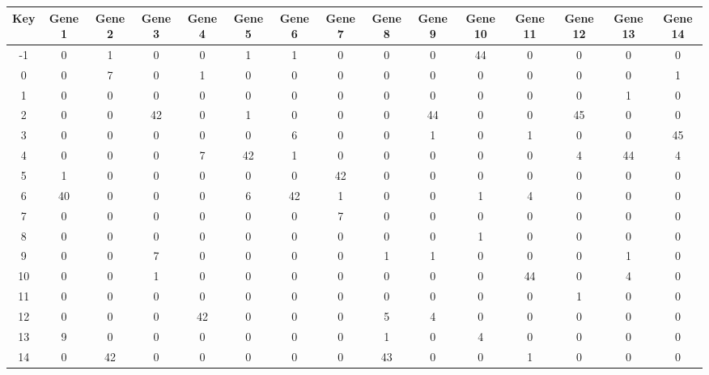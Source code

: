 \begin{tabular}{|c|c|c|c|c|c|c|c|c|c|c|c|c|c|c|}
\hline
Key & Gene 1 & Gene 2 & Gene 3 & Gene 4 & Gene 5 & Gene 6 & Gene 7 & Gene 8 & Gene 9 & Gene 10 & Gene 11 & Gene 12 & Gene 13 & Gene 14 \\
\hline
-1 & 0 & 1 & 0 & 0 & 1 & 1 & 0 & 0 & 0 & 44 & 0 & 0 & 0 & 0 \\
0 & 0 & 7 & 0 & 1 & 0 & 0 & 0 & 0 & 0 & 0 & 0 & 0 & 0 & 1 \\
1 & 0 & 0 & 0 & 0 & 0 & 0 & 0 & 0 & 0 & 0 & 0 & 0 & 1 & 0 \\
2 & 0 & 0 & 42 & 0 & 1 & 0 & 0 & 0 & 44 & 0 & 0 & 45 & 0 & 0 \\
3 & 0 & 0 & 0 & 0 & 0 & 6 & 0 & 0 & 1 & 0 & 1 & 0 & 0 & 45 \\
4 & 0 & 0 & 0 & 7 & 42 & 1 & 0 & 0 & 0 & 0 & 0 & 4 & 44 & 4 \\
5 & 1 & 0 & 0 & 0 & 0 & 0 & 42 & 0 & 0 & 0 & 0 & 0 & 0 & 0 \\
6 & 40 & 0 & 0 & 0 & 6 & 42 & 1 & 0 & 0 & 1 & 4 & 0 & 0 & 0 \\
7 & 0 & 0 & 0 & 0 & 0 & 0 & 7 & 0 & 0 & 0 & 0 & 0 & 0 & 0 \\
8 & 0 & 0 & 0 & 0 & 0 & 0 & 0 & 0 & 0 & 1 & 0 & 0 & 0 & 0 \\
9 & 0 & 0 & 7 & 0 & 0 & 0 & 0 & 1 & 1 & 0 & 0 & 0 & 1 & 0 \\
10 & 0 & 0 & 1 & 0 & 0 & 0 & 0 & 0 & 0 & 0 & 44 & 0 & 4 & 0 \\
11 & 0 & 0 & 0 & 0 & 0 & 0 & 0 & 0 & 0 & 0 & 0 & 1 & 0 & 0 \\
12 & 0 & 0 & 0 & 42 & 0 & 0 & 0 & 5 & 4 & 0 & 0 & 0 & 0 & 0 \\
13 & 9 & 0 & 0 & 0 & 0 & 0 & 0 & 1 & 0 & 4 & 0 & 0 & 0 & 0 \\
14 & 0 & 42 & 0 & 0 & 0 & 0 & 0 & 43 & 0 & 0 & 1 & 0 & 0 & 0 \\
\hline
\end{tabular}
